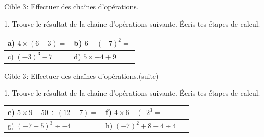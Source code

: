 \documentclass[11pt]{article}
\begin{document}
\vspace{5mm}



\newpage



\begin{cible}{Cible 3: Effectuer des chaînes d'opérations.}

1. Trouve le résultat de la chaine d'opérations suivante. Écris tes étapes de calcul.

\vspace{1cm}

\renewcommand{\arraystretch}{1}
\begin{tabular}{|p{7.7cm}|p{7.7cm}|}
\hline
\rule{0pt}{4mm} a) $4 \times (6+3) = $ & b) $6 - (-7)^2 = $ \\[8cm]
\hline
\rule{0pt}{4mm} c) $ (-3)^3 - 7 = $ & d) $5 \times -4 + 9 = $ \\[8cm]
\hline
\end{tabular}

\end{cible}

\newpage

\begin{cible}{Cible 3: Effectuer des chaînes d'opérations.(suite)}

1. Trouve le résultat de la chaine d'opérations suivante. Écris tes étapes de calcul.

\vspace{1cm}

\renewcommand{\arraystretch}{1}
\begin{tabular}{|p{7.7cm}|p{7.7cm}|}
\hline
\rule{0pt}{4mm} e) $5 \times 9 - 50 \div (12-7) = $ & f) $ 4 \times 6 - (-2^3 = $ \\[8cm]
\hline
\rule{0pt}{4mm} g) $(-7+5)^3 \div -4 = $ & h) $(-7)^2 + 8 - 4 \div 4 = $ \\[8cm]
\hline
\end{tabular}

\end{cible}
\end{document}
